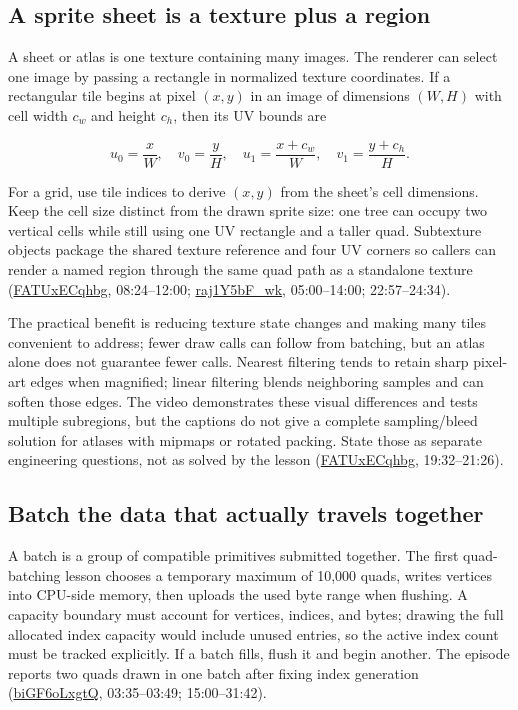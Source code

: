 \subsection{A sprite sheet is a texture plus a region}\label{06-engine-ii-ch026-a-sprite-sheet-is-a-texture-plus-a-region}

A sheet or atlas is one texture containing many images. The renderer can select one image by passing a rectangle in normalized texture coordinates. If a rectangular tile begins at pixel \((x,y)\) in an image of dimensions \((W,H)\) with cell width \(c_w\) and height \(c_h\), then its UV bounds are

\[u_0=\frac{x}{W},\quad v_0=\frac{y}{H},\quad u_1=\frac{x+c_w}{W},\quad v_1=\frac{y+c_h}{H}.\]

For a grid, use tile indices to derive \((x,y)\) from the sheet's cell dimensions. Keep the cell size distinct from the drawn sprite size: one tree can occupy two vertical cells while still using one UV rectangle and a taller quad. Subtexture objects package the shared texture reference and four UV corners so callers can render a named region through the same quad path as a standalone texture (\href{https://www.youtube.com/watch?v=FATUxECqhbg}{FATUxECqhbg}, 08:24--12:00; \href{https://www.youtube.com/watch?v=raj1Y5bF_wk}{raj1Y5bF\_wk}, 05:00--14:00; 22:57--24:34).

The practical benefit is reducing texture state changes and making many tiles convenient to address; fewer draw calls can follow from batching, but an atlas alone does not guarantee fewer calls. Nearest filtering tends to retain sharp pixel-art edges when magnified; linear filtering blends neighboring samples and can soften those edges. The video demonstrates these visual differences and tests multiple subregions, but the captions do not give a complete sampling/bleed solution for atlases with mipmaps or rotated packing. State those as separate engineering questions, not as solved by the lesson (\href{https://www.youtube.com/watch?v=FATUxECqhbg}{FATUxECqhbg}, 19:32--21:26).

\subsection{Batch the data that actually travels together}\label{06-engine-ii-ch026-batch-the-data-that-actually-travels-together}

A batch is a group of compatible primitives submitted together. The first quad-batching lesson chooses a temporary maximum of 10,000 quads, writes vertices into CPU-side memory, then uploads the used byte range when flushing. A capacity boundary must account for vertices, indices, and bytes; drawing the full allocated index capacity would include unused entries, so the active index count must be tracked explicitly. If a batch fills, flush it and begin another. The episode reports two quads drawn in one batch after fixing index generation (\href{https://www.youtube.com/watch?v=biGF6oLxgtQ}{biGF6oLxgtQ}, 03:35--03:49; 15:00--31:42).


